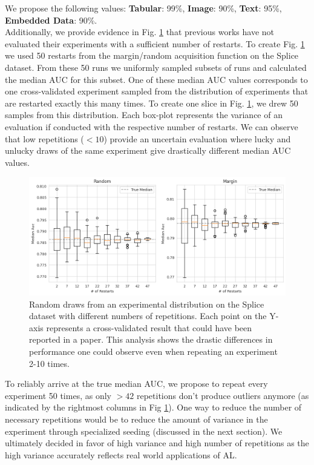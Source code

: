 \documentclass[]{article}
\begin{document}
We propose the following values: \textbf{Tabular}: 99\%, \textbf{Image}: 90\%, \textbf{Text}: 95\%, \textbf{Embedded Data}: 90\%. \\ [1mm]
Additionally, we provide evidence in Fig. \ref{fig:restarts} that previous works have not evaluated their experiments with a sufficient number of restarts.
To create Fig. \ref{fig:restarts} we used 50 restarts from the margin/random acquisition function on the Splice dataset.
From these 50 runs we uniformly sampled subsets of runs and calculated the median AUC for this subset.
One of these median AUC values corresponds to one cross-validated experiment sampled from the distribution of experiments that are restarted exactly this many times.
To create one slice in Fig. \ref{fig:restarts}, we drew 50 samples from this distribution.
Each box-plot represents the variance of an evaluation if conducted with the respective number of restarts.
We can observe that low repetitions ($<10$) provide an uncertain evaluation where lucky and unlucky draws of the same experiment give drastically different median AUC values.
\begin{figure}
	\centering
	\includegraphics[width=\linewidth]{img/ablation_restarts}
	\caption{Random draws from an experimental distribution on the Splice dataset with different numbers of repetitions. Each point on the Y-axis represents a cross-validated result that could have been reported in a paper. This analysis shows the drastic differences in performance one could observe even when repeating an experiment 2-10 times.}
	\label{fig:restarts}
\end{figure}
To reliably arrive at the true median AUC, we propose to repeat every experiment 50 times, as only $>42$ repetitions don't produce outliers anymore (as indicated by the rightmost columns in Fig \ref{fig:restarts}).
One way to reduce the number of necessary repetitions would be to reduce the amount of variance in the experiment through specialized seeding (discussed in the next section).
We ultimately decided in favor of high variance and high number of repetitions as the high variance accurately reflects real world applications of AL.
\end{document}

